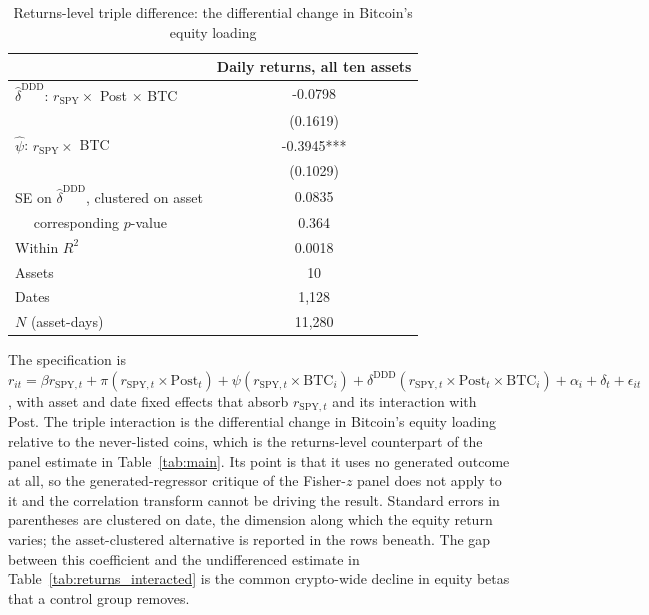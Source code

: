 \begin{table}[t]
\centering
\begin{threeparttable}
\caption{Returns-level triple difference: the differential change in Bitcoin's equity loading}
\label{tab:ddd}
\begin{tabular}{lc}
\toprule
 & Daily returns, all ten assets \\
\midrule
$\hat\delta^{\mathrm{DDD}}$: $r_{\mathrm{SPY}} \times$ Post $\times$ BTC & -0.0798 \\
 & (0.1619) \\
$\hat\psi$: $r_{\mathrm{SPY}} \times$ BTC & -0.3945*** \\
 & (0.1029) \\
SE on $\hat\delta^{\mathrm{DDD}}$, clustered on asset & 0.0835 \\
$\quad$ corresponding $p$-value & 0.364 \\
Within $R^2$ & 0.0018 \\
Assets & 10 \\
Dates & 1,128 \\
$N$ (asset-days) & 11,280 \\
\bottomrule
\end{tabular}
\begin{tablenotes}[flushleft]
\footnotesize
\item The specification is $r_{it} = \beta r_{\mathrm{SPY},t} + \pi (r_{\mathrm{SPY},t} \times \mathrm{Post}_t) + \psi (r_{\mathrm{SPY},t} \times \mathrm{BTC}_i) + \delta^{\mathrm{DDD}} (r_{\mathrm{SPY},t} \times \mathrm{Post}_t \times \mathrm{BTC}_i) + \alpha_i + \delta_t + \epsilon_{it}$, with asset and date fixed effects that absorb $r_{\mathrm{SPY},t}$ and its interaction with Post. The triple interaction is the differential change in Bitcoin's equity loading relative to the never-listed coins, which is the returns-level counterpart of the panel estimate in Table~\ref{tab:main}. Its point is that it uses no generated outcome at all, so the generated-regressor critique of the Fisher-$z$ panel does not apply to it and the correlation transform cannot be driving the result. Standard errors in parentheses are clustered on date, the dimension along which the equity return varies; the asset-clustered alternative is reported in the rows beneath. The gap between this coefficient and the undifferenced estimate in Table~\ref{tab:returns_interacted} is the common crypto-wide decline in equity betas that a control group removes.
\end{tablenotes}
\end{threeparttable}
\end{table}
